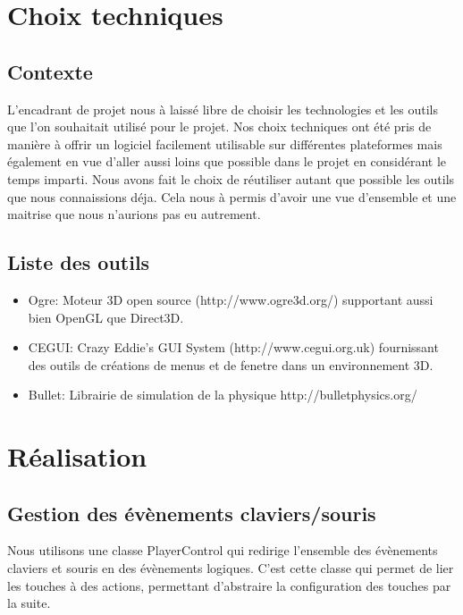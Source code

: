 \documentclass[frenchb,twoside]{EPURapport}
\begin{document}
   
    
    
\chapter{Choix techniques}
    \section{Contexte}
    L'encadrant de projet nous à laissé libre de choisir les technologies et
    les outils que l'on souhaitait utilisé pour le projet. Nos choix techniques
    ont été pris de manière à offrir un logiciel facilement utilisable sur
    différentes plateformes mais également en vue d'aller aussi loins que
    possible dans le projet en considérant le temps imparti. Nous avons fait le
    choix de réutiliser autant que possible les outils que nous connaissions
    déja. Cela nous à permis d'avoir une vue d'ensemble et une maitrise que
    nous n'aurions pas eu autrement.
    

    \section{Liste des outils}
    \begin{itemize}
        \item Ogre: Moteur 3D open source
        (http://www.ogre3d.org/) supportant aussi bien OpenGL que Direct3D. 
        \item CEGUI: Crazy Eddie's GUI System
        (http://www.cegui.org.uk) fournissant des outils de créations de menus
        et de fenetre dans un environnement 3D.
        \item Bullet: Librairie de simulation de
        la physique http://bulletphysics.org/
    \end{itemize}
    

\chapter{Réalisation}
    \section{Gestion des évènements claviers/souris}
        Nous utilisons une classe PlayerControl qui redirige l'ensemble des
        évènements claviers et souris en des évènements logiques. C'est cette
        classe qui permet de lier les touches à des actions, permettant
        d'abstraire la configuration des touches par la suite.
\end{document}
